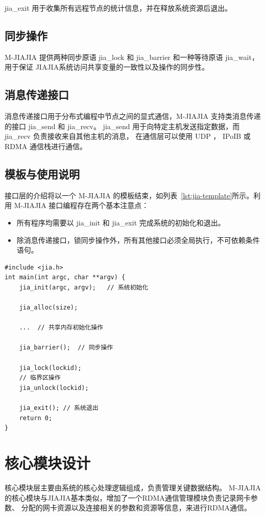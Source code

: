 {    jia\_exit 用于收集所有远程节点的统计信息，并在释放系统资源后退出。
    \subsection{同步操作}
    M-JIAJIA 提供两种同步原语 jia\_lock 和 jia\_barrier 和一种等待原语 jia\_wait，
    用于保证 JIAJIA系统访问共享变量的一致性以及操作的同步性。

    \subsection{消息传递接口}
    消息传递接口用于分布式编程中节点之间的显式通信，M-JIAJIA 支持类消息传递的接口 jia\_send 和 jia\_recv。
    jia\_send 用于向特定主机发送指定数据，而 jia\_recv 负责接收来自其他主机的消息，
    在通信层可以使用 UDP ， IPoIB 或 RDMA 通信栈进行通信。

    \newpage
    \subsection{模板与使用说明}
    接口层的介绍将以一个 M-JIAJIA 的模板结束，如列表~\ref{lst:jia-template}所示。利用 M-JIAJIA 接口编程存在两个基本注意点：
    \begin{itemize}
        \item 所有程序均需要以 jia\_init 和 jia\_exit 完成系统的初始化和退出。
        \item 除消息传递接口，锁同步操作外，所有其他接口必须全局执行，不可依赖条件语句。
    \end{itemize}
    \begin{lstlisting}[style=CStyle, caption={M-JIAJIA 应用模板}, label={lst:jia-template}]
#include <jia.h>
int main(int argc, char **argv) {
    jia_init(argc, argv);   // 系统初始化

    jia_alloc(size);
    
    ...  // 共享内存初始化操作

    jia_barrier();  // 同步操作    

    jia_lock(lockid);
    // 临界区操作
    jia_unlock(lockid);
    
    jia_exit(); // 系统退出
    return 0;
}
    \end{lstlisting}

    \section{核心模块设计}\label{sec:核心模块设计}
    核心模块层主要由系统的核心处理逻辑组成，负责管理关键数据结构。
    M-JIAJIA的核心模块与JIAJIA基本类似，增加了一个RDMA通信管理模块负责记录网卡参数、
    分配的网卡资源以及连接相关的参数和资源等信息，来进行RDMA通信。

}
